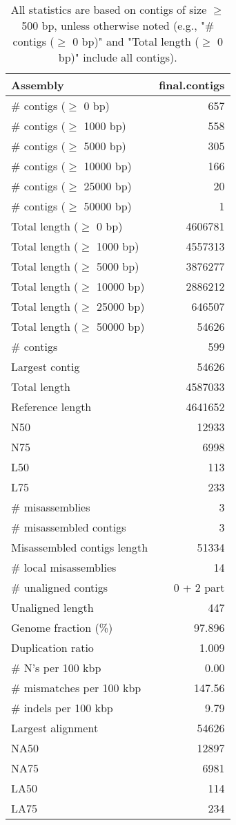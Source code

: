 \documentclass[12pt,a4paper]{article}
\begin{document}
\begin{table}[ht]
\begin{center}
\caption{All statistics are based on contigs of size $\geq$ 500 bp, unless otherwise noted (e.g., "\# contigs ($\geq$ 0 bp)" and "Total length ($\geq$ 0 bp)" include all contigs).}
\begin{tabular}{|l*{1}{|r}|}
\hline
Assembly & final.contigs \\ \hline
\# contigs ($\geq$ 0 bp) & 657 \\ \hline
\# contigs ($\geq$ 1000 bp) & 558 \\ \hline
\# contigs ($\geq$ 5000 bp) & 305 \\ \hline
\# contigs ($\geq$ 10000 bp) & 166 \\ \hline
\# contigs ($\geq$ 25000 bp) & 20 \\ \hline
\# contigs ($\geq$ 50000 bp) & 1 \\ \hline
Total length ($\geq$ 0 bp) & 4606781 \\ \hline
Total length ($\geq$ 1000 bp) & 4557313 \\ \hline
Total length ($\geq$ 5000 bp) & 3876277 \\ \hline
Total length ($\geq$ 10000 bp) & 2886212 \\ \hline
Total length ($\geq$ 25000 bp) & 646507 \\ \hline
Total length ($\geq$ 50000 bp) & 54626 \\ \hline
\# contigs & 599 \\ \hline
Largest contig & 54626 \\ \hline
Total length & 4587033 \\ \hline
Reference length & 4641652 \\ \hline
N50 & 12933 \\ \hline
N75 & 6998 \\ \hline
L50 & 113 \\ \hline
L75 & 233 \\ \hline
\# misassemblies & 3 \\ \hline
\# misassembled contigs & 3 \\ \hline
Misassembled contigs length & 51334 \\ \hline
\# local misassemblies & 14 \\ \hline
\# unaligned contigs & 0 + 2 part \\ \hline
Unaligned length & 447 \\ \hline
Genome fraction (\%) & 97.896 \\ \hline
Duplication ratio & 1.009 \\ \hline
\# N's per 100 kbp & 0.00 \\ \hline
\# mismatches per 100 kbp & 147.56 \\ \hline
\# indels per 100 kbp & 9.79 \\ \hline
Largest alignment & 54626 \\ \hline
NA50 & 12897 \\ \hline
NA75 & 6981 \\ \hline
LA50 & 114 \\ \hline
LA75 & 234 \\ \hline
\end{tabular}
\end{center}
\end{table}
\end{document}
